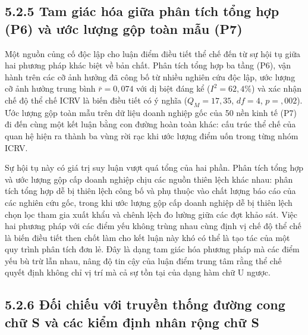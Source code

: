 \documentclass[
  a4paper,
  13pt]{extreport}
\begin{document}
\hypertarget{tam-giuxe1c-huxf3a-giux1eefa-phuxe2n-tuxedch-tux1ed5ng-hux1ee3p-p6-vuxe0-ux1b0ux1edbc-lux1b0ux1ee3ng-gux1ed9p-touxe0n-mux1eabu-p7}{%
\subsection{5.2.5 Tam giác hóa giữa phân tích tổng hợp (P6) và ước lượng
gộp toàn mẫu
(P7)}\label{tam-giuxe1c-huxf3a-giux1eefa-phuxe2n-tuxedch-tux1ed5ng-hux1ee3p-p6-vuxe0-ux1b0ux1edbc-lux1b0ux1ee3ng-gux1ed9p-touxe0n-mux1eabu-p7}}

Một nguồn củng cố độc lập cho luận điểm điều tiết thể chế đến từ sự hội
tụ giữa hai phương pháp khác biệt về bản chất. Phân tích tổng hợp ba
tầng (P6), vận hành trên các cỡ ảnh hưởng đã công bố từ nhiều nghiên cứu
độc lập, ước lượng cỡ ảnh hưởng trung bình \(\bar{r} = 0{,}074\) với dị
biệt đáng kể (\(I^2 = 62{,}4\%\)) và xác nhận chế độ thể chế ICRV là
biến điều tiết có ý nghĩa (\(Q_M = 17{,}35\), \(df = 4\),
\(p = {,}002\)). Ước lượng gộp toàn mẫu trên dữ liệu doanh nghiệp gốc
của 50 nền kinh tế (P7) đi đến cùng một kết luận bằng con đường hoàn
toàn khác: cấu trúc thể chế của quan hệ hiện ra thành ba vùng rời rạc
khi ước lượng điểm uốn trong từng nhóm ICRV.

Sự hội tụ này có giá trị suy luận vượt quá tổng của hai phần. Phân tích
tổng hợp và ước lượng gộp cấp doanh nghiệp chịu các nguồn thiên lệch
khác nhau: phân tích tổng hợp dễ bị thiên lệch công bố và phụ thuộc vào
chất lượng báo cáo của các nghiên cứu gốc, trong khi ước lượng gộp cấp
doanh nghiệp dễ bị thiên lệch chọn lọc tham gia xuất khẩu và chênh lệch
đo lường giữa các đợt khảo sát. Việc hai phương pháp với các điểm yếu
không trùng nhau cùng định vị chế độ thể chế là biến điều tiết then chốt
làm cho kết luận này khó có thể là tạo tác của một quy trình phân tích
đơn lẻ. Đây là dạng tam giác hóa phương pháp mà các điểm yếu bù trừ lẫn
nhau, nâng độ tin cậy của luận điểm trung tâm rằng thể chế quyết định
không chỉ vị trí mà cả sự tồn tại của dạng hàm chữ U ngược.

\hypertarget{ux111ux1ed1i-chiux1ebfu-vux1edbi-truyux1ec1n-thux1ed1ng-ux111ux1b0ux1eddng-cong-chux1eef-s-vuxe0-cuxe1c-kiux1ec3m-ux111ux1ecbnh-nhuxe2n-rux1ed9ng-chux1eef-s}{%
\subsection{5.2.6 Đối chiếu với truyền thống đường cong chữ S và các
kiểm định nhân rộng chữ
S}\label{ux111ux1ed1i-chiux1ebfu-vux1edbi-truyux1ec1n-thux1ed1ng-ux111ux1b0ux1eddng-cong-chux1eef-s-vuxe0-cuxe1c-kiux1ec3m-ux111ux1ecbnh-nhuxe2n-rux1ed9ng-chux1eef-s}}
\end{document}
